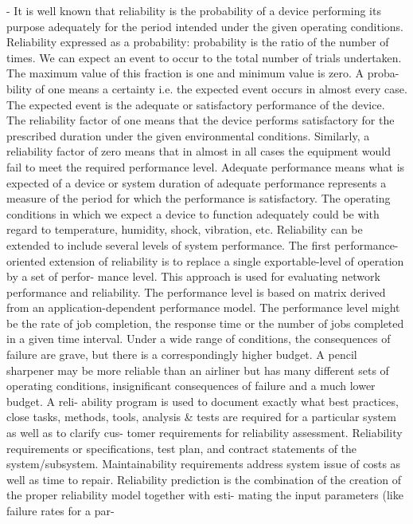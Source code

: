 \cite{ram2013system} - It is well known that reliability is the probability of a
device performing its purpose adequately for the period
intended under the given operating conditions. Reliability
expressed as a probability: probability is the ratio of the
number of times. We can expect an event to occur to the
total number of trials undertaken. The maximum value of
this fraction is one and minimum value is zero. A proba-
bility of one means a certainty i.e. the expected event
occurs in almost every case. The expected event is the
adequate or satisfactory performance of the device. The
reliability factor of one means that the device performs
satisfactory for the prescribed duration under the given
environmental conditions. Similarly, a reliability factor of
zero means that in almost in all cases the equipment would
fail to meet the required performance level. Adequate
performance means what is expected of a device or system
duration of adequate performance represents a measure of
the period for which the performance is satisfactory. The
operating conditions in which we expect a device to
function adequately could be with regard to temperature,
humidity, shock, vibration, etc. Reliability can be extended
to include several levels of system performance. The first
performance-oriented extension of reliability is to replace a
single exportable-level of operation by a set of perfor-
mance level. This approach is used for evaluating network
performance and reliability. The performance level is
based on matrix derived from an application-dependent
performance model. The performance level might be the
rate of job completion, the response time or the number of
jobs completed in a given time interval. Under a wide
range of conditions, the consequences of failure are grave,
but there is a correspondingly higher budget. A pencil
sharpener may be more reliable than an airliner but has
many different sets of operating conditions, insignificant
consequences of failure and a much lower budget. A reli-
ability program is used to document exactly what best
practices, close tasks, methods, tools, analysis & tests are
required for a particular system as well as to clarify cus-
tomer requirements for reliability assessment. Reliability
requirements or specifications, test plan, and contract
statements of the system/subsystem. Maintainability
requirements address system issue of costs as well as time
to repair. Reliability prediction is the combination of the
creation of the proper reliability model together with esti-
mating the input parameters (like failure rates for a par-
